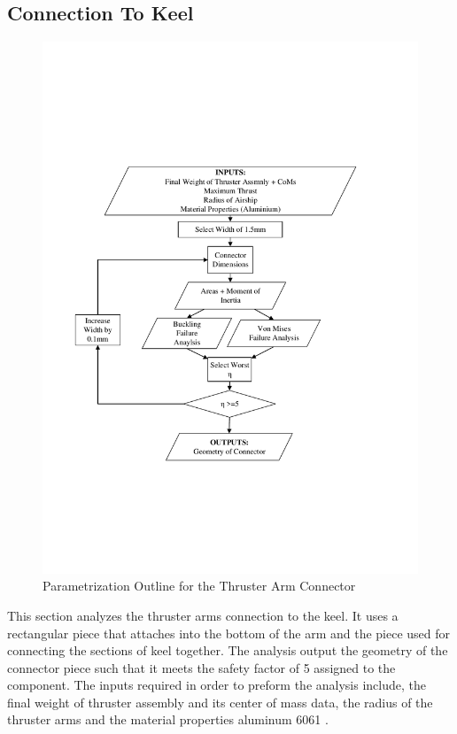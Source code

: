\documentclass[../main.tex]{subfiles}
\begin{document}
\subsection{Connection To Keel} \label{connector}
\begin{figure}[H]
	\centering
	\includegraphics[width=.9\linewidth]{img/paramaterization/connector.pdf}
	\caption{Parametrization Outline for the Thruster Arm Connector}
	\label{fig:connectorParametrization}
\end{figure}

This section analyzes the thruster arms connection to the keel. It uses a rectangular piece that attaches into the bottom of the arm and the piece used for connecting the sections of keel together. The analysis output the geometry of the connector piece such that it meets the safety factor of 5 assigned to the component. The inputs required in order to preform the analysis include, the final weight of thruster assembly and its center of mass data, the radius of the thruster arms and the material properties aluminum 6061 \cite{AlProperties}. 
\end{document}
